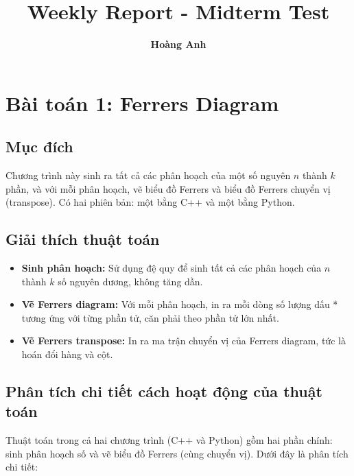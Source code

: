\documentclass[12pt]{article}
\title{\vspace{-1cm} \textbf{Weekly Report - Midterm Test}}
\author{\textbf{Hoàng Anh}}
\begin{document}
\maketitle
\vspace{-1cm}


\section*{Bài toán 1: Ferrers Diagram}

\subsection*{Mục đích}
Chương trình này sinh ra tất cả các phân hoạch của một số nguyên $n$ thành $k$ phần, và với mỗi phân hoạch, vẽ biểu đồ Ferrers và biểu đồ Ferrers chuyển vị (transpose). Có hai phiên bản: một bằng C++ và một bằng Python.

\subsection*{Giải thích thuật toán}

\begin{itemize}
  \item \textbf{Sinh phân hoạch:} Sử dụng đệ quy để sinh tất cả các phân hoạch của $n$ thành $k$ số nguyên dương, không tăng dần.
  \item \textbf{Vẽ Ferrers diagram:} Với mỗi phân hoạch, in ra mỗi dòng số lượng dấu * tương ứng với từng phần tử, căn phải theo phần tử lớn nhất.
  \item \textbf{Vẽ Ferrers transpose:} In ra ma trận chuyển vị của Ferrers diagram, tức là hoán đổi hàng và cột.
\end{itemize}

\subsection*{Phân tích chi tiết cách hoạt động của thuật toán}
Thuật toán trong cả hai chương trình (C++ và Python) gồm hai phần chính: sinh phân hoạch số và vẽ biểu đồ Ferrers (cùng chuyển vị). Dưới đây là phân tích chi tiết:
\end{document}
